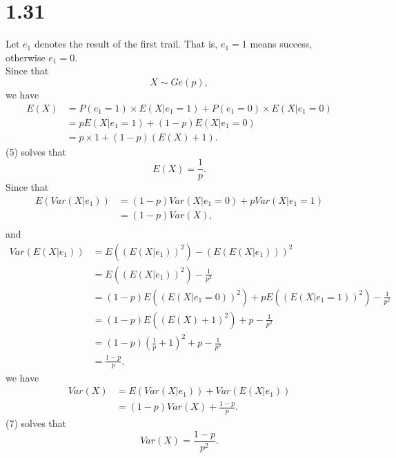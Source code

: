 \documentclass{article}
\begin{document}
\section{1.31}
Let $e_1$ denotes the result of the first trail. That is, $e_1 = 1$ means success, otherwise $e_1 = 0$. \\
Since that 
\begin{equation*}
    X \sim Ge(p),
\end{equation*}
we have
\begin{align}
    E(X) &= P(e_1 = 1) \times E(X|e_1 = 1) + P(e_1 = 0) \times E(X|e_1 = 0) \\
    &= p E(X|e_1 = 1) + (1 - p) E(X|e_1 = 0) \\
    &= p \times 1 + (1 - p) (E(X) + 1).
\end{align}
(5) solves that
\begin{equation*}
    E(X) = \frac{1}{p}.
\end{equation*}
Since that
\begin{align*}
    E(Var(X|e_1)) &= (1 - p) Var(X|e_1 = 0) + p Var(X|e_1 = 1) \\
    &= (1 - p) Var(X), \\
\end{align*}
and
\begin{align*}
    Var(E(X|e_1)) &= E((E(X|e_1))^2) - (E(E(X|e_1)))^2 \\
    &= E((E(X|e_1))^2) - \frac{1}{p^2} \\
    &= (1 - p) E((E(X|e_1 = 0))^2) + p E((E(X|e_1 = 1))^2) - \frac{1}{p^2} \\
    &= (1 - p)E((E(X) + 1)^2) + p - \frac{1}{p^2} \\
    &= (1 - p) (\frac{1}{p} + 1)^2 + p - \frac{1}{p^2} \\
    &= \frac{1 - p}{p},
\end{align*}
we have
\begin{align}
    Var(X) &= E(Var(X|e_1)) + Var(E(X|e_1)) \\
    &= (1 - p) Var(X) + \frac{1 - p}{p}. 
\end{align}
(7) solves that
\begin{equation*}
    Var(X) = \frac{1 - p}{p^2}.
\end{equation*}
\end{document}
